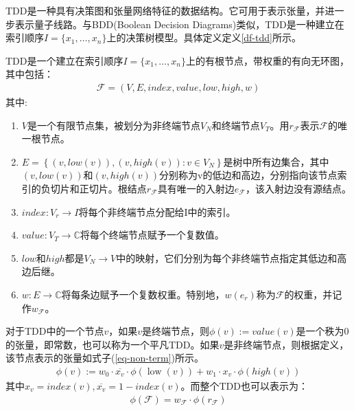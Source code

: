 TDD是一种具有决策图和张量网络特征的数据结构\citep{Hong_2022}。它可用于表示张量，并进一步表示量子线路。与BDD(Boolean Decision Diagrams)类似，TDD是一种建立在索引顺序$I=\{x_1,\ldots,x_n\}$上的决策树模型。具体定义定义\ref{df-tdd}所示。
\begin{definition}\citep{Hong_2022}
    \label{df-tdd}
    TDD是一个建立在索引顺序$I=\{x_1,\ldots,x_n\}$上的有根节点，带权重的有向无环图，其中包括：
    \begin{align}
        \mathcal{F}=\left(V,E,index,value,low,high,w\right)
    \end{align}
    其中:
    \begin{enumerate}
        \item $V$是一个有限节点集，被划分为非终端节点$V_N$和终端节点$V_T$。用$r_{\mathcal{F}}$表示$\mathcal{F}$的唯一根节点。
        \item $E=\left\{\left(v,low\left(v\right)\right),\left(v,high\left(v\right)\right):v\in V_N\right\}$是树中所有边集合，其中$\left(v,low\left(v\right)\right)$和$\left(v,high\left(v\right)\right)$分别称为v的低边和高边，分别指向该节点索引的负切片和正切片。根结点$r_{\mathcal{F}}$具有唯一的入射边$e_{\mathcal{F}}$，该入射边没有源结点。
        \item $index:V_r\rightarrow I$将每个非终端节点分配给I中的索引。
        \item $value:V_T\rightarrow\mathbb{C}$将每个终端节点赋予一个复数值。
        \item $low$和$high$都是$V_N\rightarrow V$中的映射，它们分别为每个非终端节点指定其低边和高边后继。
        \item $w:E\rightarrow\mathbb{C}$将每条边赋予一个复数权重。特别地，$w\left(e_r\right)$称为$\mathcal{F}$的权重，并记作$w_{\mathcal{F}}$。
    \end{enumerate} 
\end{definition}


对于TDD中的一个节点$v$，如果$v$是终端节点，则$\phi\left(v\right):= value (v)$是一个秩为$0$的张量，即常数，也可以称为一个平凡TDD。如果$v$是非终端节点，则根据定义，该节点表示的张量如式子(\ref{eq-non-term})所示。
\begin{align}
    \label{eq-non-term}
    \phi(v):=w_{0} \cdot \overline{x_{v}} \cdot \phi(\operatorname{low}(v))+w_{1} \cdot x_{v} \cdot \phi(h i g h(v))
\end{align}
其中$x_v=index\left(v\right),\overline{x_{v}}=1-index\left(v\right)$。而整个TDD也可以表示为：
\begin{align}
    \phi\left(\mathcal{F}\right)=w_{\mathcal{F}}\cdot\phi\left(r_{\mathcal{F}}\right)
\end{align}


